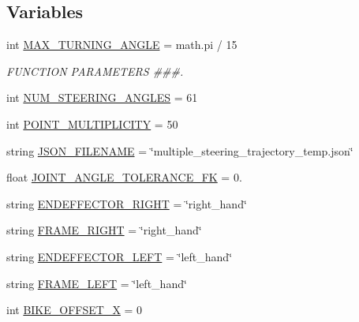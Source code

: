 \subsection*{Variables}
\begin{DoxyCompactItemize}
\item 
int \mbox{\hyperlink{namespacemultiple__steering__trajectories_a63027f9d1122b33f09e89dede32694c1}{M\+A\+X\+\_\+\+T\+U\+R\+N\+I\+N\+G\+\_\+\+A\+N\+G\+LE}} = math.\+pi / 15
\begin{DoxyCompactList}\small\item\em F\+U\+N\+C\+T\+I\+ON P\+A\+R\+A\+M\+E\+T\+E\+RS \#\#\#. \end{DoxyCompactList}\item 
int \mbox{\hyperlink{namespacemultiple__steering__trajectories_ae01ead2eab31342b64905121c52a897a}{N\+U\+M\+\_\+\+S\+T\+E\+E\+R\+I\+N\+G\+\_\+\+A\+N\+G\+L\+ES}} = 61
\item 
int \mbox{\hyperlink{namespacemultiple__steering__trajectories_a5a66777f142f541c2bac7ea4680e2e63}{P\+O\+I\+N\+T\+\_\+\+M\+U\+L\+T\+I\+P\+L\+I\+C\+I\+TY}} = 50
\item 
string \mbox{\hyperlink{namespacemultiple__steering__trajectories_aa355bc2e0e301b38a7d97bdf4ad19b76}{J\+S\+O\+N\+\_\+\+F\+I\+L\+E\+N\+A\+ME}} = \char`\"{}multiple\+\_\+steering\+\_\+trajectory\+\_\+temp.\+json\char`\"{}
\item 
float \mbox{\hyperlink{namespacemultiple__steering__trajectories_a8e1de9cfe4ac9f533949d1f994ef6b95}{J\+O\+I\+N\+T\+\_\+\+A\+N\+G\+L\+E\+\_\+\+T\+O\+L\+E\+R\+A\+N\+C\+E\+\_\+\+FK}} = 0.
\item 
string \mbox{\hyperlink{namespacemultiple__steering__trajectories_a05dd6dec9d699654ff6be92ea3dc7aec}{E\+N\+D\+E\+F\+F\+E\+C\+T\+O\+R\+\_\+\+R\+I\+G\+HT}} = \char`\"{}right\+\_\+hand\char`\"{}
\item 
string \mbox{\hyperlink{namespacemultiple__steering__trajectories_a38c98a09ab902314c49880c83b9c795f}{F\+R\+A\+M\+E\+\_\+\+R\+I\+G\+HT}} = \char`\"{}right\+\_\+hand\char`\"{}
\item 
string \mbox{\hyperlink{namespacemultiple__steering__trajectories_abefb82ec55be4ee086ccc5b55c3d7ee6}{E\+N\+D\+E\+F\+F\+E\+C\+T\+O\+R\+\_\+\+L\+E\+FT}} = \char`\"{}left\+\_\+hand\char`\"{}
\item 
string \mbox{\hyperlink{namespacemultiple__steering__trajectories_a8b05b3d1ffa210c5af79a1cf606c94e7}{F\+R\+A\+M\+E\+\_\+\+L\+E\+FT}} = \char`\"{}left\+\_\+hand\char`\"{}
\item 
int \mbox{\hyperlink{namespacemultiple__steering__trajectories_a8ed31e3e77c86166c3e8b31b25005589}{B\+I\+K\+E\+\_\+\+O\+F\+F\+S\+E\+T\+\_\+X}} = 0

\end{DoxyCompactItemize}
